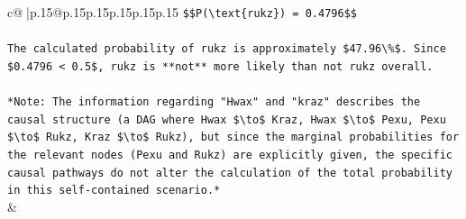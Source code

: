\documentclass{article}
\begin{document}
{\begin{supertabular}{c@{$\;$}|p{.15\linewidth}@{}p{.15\linewidth}p{.15\linewidth}p{.15\linewidth}p{.15\linewidth}p{.15\linewidth}}
{{{\texttt{\$\$P(\textbackslash{}text\{rukz\}) = 0.4796\$\$} \\
\\ 
\texttt{The calculated probability of rukz is approximately \$47.96\textbackslash{}\%\$. Since \$0.4796 < 0.5\$, rukz is **not** more likely than not rukz overall.} \\
\\ 
\texttt{*Note: The information regarding "Hwax" and "kraz" describes the causal structure (a DAG where Hwax \$\textbackslash{}to\$ Kraz, Hwax \$\textbackslash{}to\$ Pexu, Pexu \$\textbackslash{}to\$ Rukz, Kraz \$\textbackslash{}to\$ Rukz), but since the marginal probabilities for the relevant nodes (Pexu and Rukz) are explicitly given, the specific causal pathways do not alter the calculation of the total probability in this self{-}contained scenario.*} \\
            }
        }
    }
    & \\ \\


\end{supertabular}}
\end{document}
